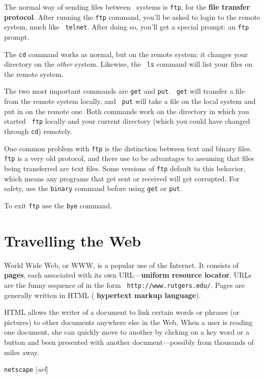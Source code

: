 The normal way of sending files between \unix\ systems is {\tt ftp},
for the {\bf file transfer protocol}.  After running the {\tt ftp}
command, you'll be asked to login to the remote system, much like {\tt
  telnet}.  After doing so, you'll get a special prompt: an {\tt ftp}
prompt.

The {\tt cd} command works as normal, but on the remote system: it
changes your directory on the \emph{other} system.  Likewise, the {\tt
  ls} command will list your files on the remote system.

The two most important commands are {\tt get} and {\tt put}.  {\tt
  get} will transfer a file from the remote system locally, and {\tt
  put} will take a file on the local system and put in on the remote
one.  Both commands work on the directory in which you started {\tt
  ftp} locally and your current directory (which you could have
  changed through {\tt cd}) remotely.

One common problem with {\tt ftp} is the distinction between text and
binary files.  {\tt ftp} is a very old protocol, and there use to be
advantages to assuming that files being transferred are text files.
Some versions of {\tt ftp} default to this behavior, which means any
programs that get sent or received will get corrupted.  For safety,
use the {\tt binary} command before using {\tt get} or {\tt put}.

To exit {\tt ftp} use the {\tt bye} command.

\section{Travelling the Web}

World Wide Web, or WWW, is a popular use of the Internet.  It consists
of {\bf pages}, each associated with its own URL---{\bf uniform
  resource locator}.  URLs are the funny sequence of in the form {\tt
  http://www.rutgers.edu/}.  Pages are generally written in HTML ({\bf
  hypertext markup language}).

HTML allows the writer of a document to link certain words or phrases
(or pictures) to other documents anywhere else in the Web.  When a
user is reading one document, she can quickly move to another by
clicking on a key word or a button and been presented with another
document---possibly from thousands of miles away.

\begin{command}
  {\tt netscape} [{\sl url}]
\end{command}

